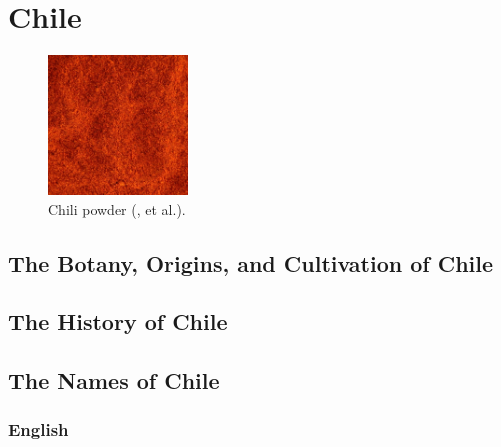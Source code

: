 \section{Chile}
\label{sec:chile}






\begin{figure}
	\vspace{-\baselineskip}
	\includegraphics[width=0.33\textwidth]{imgs/spices/chile-1.jpg}
	\caption{Chili powder (, et al.).}
	\label{fig:chile}
\end{figure}

\subsection{The Botany, Origins, and Cultivation of Chile}

\subsection{The History of Chile}

\subsection{The Names of Chile}

\subsubsection{English}

